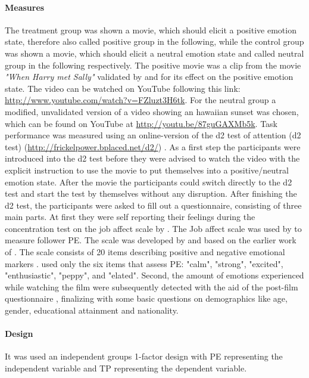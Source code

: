\documentclass[	
	12pt, %
	a4paper, %
  abstracton
]{scrartcl}\usepackage[]{graphicx}\usepackage[]{color}
\begin{document}
\paragraph{Measures}
 The treatment group was shown a movie, which should elicit a positive emotion state, therefore also called positive group in the following, while the control group was shown a movie, which should elicit a neutral emotion state and called neutral group in the following respectively. The positive movie was a clip from the movie \textit{"When Harry met Sally"} validated by  and  for its effect on the positive emotion state. The video can be watched on YouTube following this link: \url{http://www.youtube.com/watch?v=FZluzt3H6tk}. For the neutral group a modified, unvalidated version of a video showing an hawaiian sunset was chosen, which can be found on YouTube at \url{http://youtu.be/87guGAXMb5k}. Task performance was measured using an online-version of the d2 test of attention (d2 test) (\url{http://frickelpower.bplaced.net/d2/}) \cite{Brickenkamp1962, Raviv1990, Schmidt-Atzert2004}. As a first step the participants were introduced into the d2 test before they were advised to watch the video with the explicit instruction to use the movie to put themselves into a positive/neutral emotion state. After the movie the participants could switch directly to the d2 test and start the test by themselves without any disruption. After finishing the d2 test, the participants were asked to fill out a questionnaire, consisting of three main parts. At first they were self reporting their feelings during the concentration test on the job affect scale by . The Job affect scale was used by  to measure follower PE. The scale was developed by   and based on the earlier work of . The scale consists of 20 items describing positive and negative emotional markers \cite{Liang2012}.  used only the six items that assess PE: "calm", "strong", "excited", "enthusiastic", "peppy", and "elated". Second, the amount of emotions experienced while watching the film were subsequently detected with the aid of the post-film questionnaire \cite{Rottenberg2007}, finalizing with some basic questions on demographics like age, gender, educational attainment and nationality.
 \paragraph{Design}
It was used an independent groups 1-factor design with PE representing the independent variable and TP representing the dependent variable.
\end{document}
